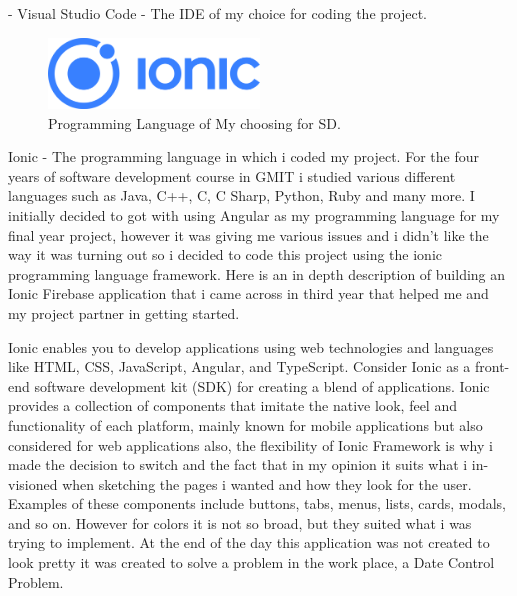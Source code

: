- Visual Studio Code - The IDE of my choice for coding the project.
\newline

\begin{figure}[h!]
	\caption{Programming Language of My choosing for SD.}
	\label{image:ionic}
	\centering
	\includegraphics[width=0.5\textwidth]{images/ionic.png}
\end{figure}
Ionic - The programming language in which i coded my project. For  the four years of software development course in GMIT i studied various different languages such as Java, C++, C, C Sharp, Python, Ruby and many more. I initially decided to got with using Angular as my programming language for my final year project, however it was giving me various issues and i didn't like the way it was turning out so i decided to code this project using the ionic programming language framework. \cite{cheng2018build} Here is an in depth description of building an Ionic Firebase application that i came across in third year that helped me and my project partner in getting started. 
\newline

Ionic enables you to develop applications using web technologies and languages like HTML, CSS, JavaScript, Angular, and TypeScript. Consider Ionic as a front-end software development kit (SDK) for creating a blend of applications. Ionic provides a collection of components that imitate the native look, feel and functionality of each platform, mainly known for mobile applications but also considered for web applications also, the flexibility of Ionic Framework is why i made the decision to switch and the fact that in my opinion it suits what i in-visioned when sketching the pages i wanted and how they look for the user. Examples of these components include buttons, tabs, menus, lists, cards, modals, and so on. However for colors it is not so broad, but they suited what i was trying to implement. At the end of the day this application was not created to look pretty it was created to solve a problem in the work place, a Date Control Problem.
\newline

